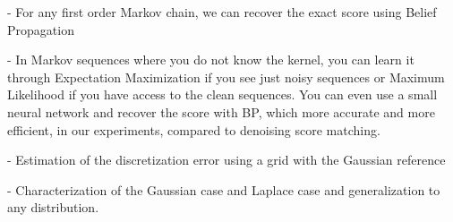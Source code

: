 - For any first order Markov chain, we can recover the exact score using Belief Propagation

- In Markov sequences where you do not know the kernel, you can learn it through Expectation Maximization if you see just noisy sequences or Maximum Likelihood if you have access to the clean sequences. You can even use a small neural network and recover the score with BP, which more accurate and more efficient, in our experiments, compared to denoising score matching. 

- Estimation of the discretization error using a grid with the Gaussian reference

- Characterization of the Gaussian case and Laplace case and generalization to any distribution.



